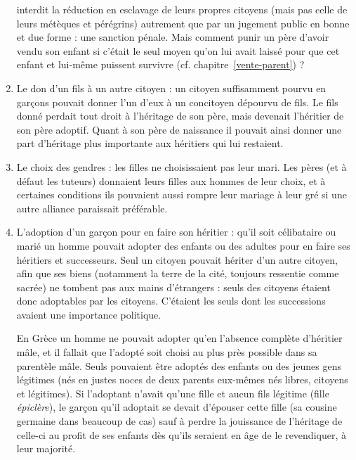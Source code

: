 \begin{enumerate}
interdit la réduction en esclavage de leurs propres citoyens (mais pas
celle de leurs métèques et pérégrins) autrement que par un jugement public
en bonne et due forme : une sanction pénale. Mais comment punir
un père d'avoir vendu son enfant si c'était le seul moyen qu'on lui avait
laissé pour que cet enfant et lui-même puissent survivre (cf. chapitre~\vref{vente-parent}) ?
\item Le don d'un fils à un autre citoyen : un citoyen suffisamment
pourvu en garçons pouvait donner l'un d'eux à un concitoyen dépourvu
de fils. Le fils donné perdait tout droit à l'héritage de son père, mais devenait
l'héritier de son père adoptif. Quant à son père de naissance il
pouvait ainsi donner une part d'héritage plus importante aux héritiers qui
lui restaient.
\item Le choix des gendres : les filles ne choisissaient pas leur mari.
Les pères (et à défaut les tuteurs) donnaient leurs filles aux hommes de
leur choix, et à certaines conditions ils pouvaient aussi rompre leur mariage
à leur gré si une autre alliance paraissait préférable.
\item L'adoption d'un garçon pour en faire son héritier : qu'il soit célibataire
ou marié un homme pouvait adopter des enfants ou des adultes
pour en faire ses héritiers et successeurs. Seul un citoyen pouvait hériter
d'un autre citoyen, afin que ses biens (notamment la terre de la cité, toujours
ressentie comme sacrée) ne tombent pas aux mains d'étrangers :
seuls des citoyens étaient donc adoptables par les citoyens. C'étaient les
seuls dont les successions avaient une importance politique.

En Grèce un homme ne pouvait adopter qu'en l'absence complète
d'héritier mâle, et il fallait que l'adopté soit choisi au plus près possible
dans sa parentèle mâle. Seuls pouvaient être adoptés des enfants ou des
jeunes gens légitimes (nés en justes noces de deux parents eux-mêmes
nés libres, citoyens et légitimes). Si l'adoptant n'avait qu'une fille et aucun
fils légitime (fille \emph{épiclère}), le garçon qu'il adoptait se devait d'épouser cette
fille (sa cousine germaine dans beaucoup de cas) sauf à perdre la jouissance
de l'héritage de celle-ci au profit de ses enfants dès qu'ils seraient
en âge de le revendiquer, à leur majorité.


\end{enumerate}
